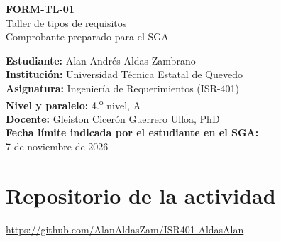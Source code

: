 \documentclass[11pt,a4paper]{article}
\begin{document}
\begin{center}
{\Large\bfseries FORM-TL-01}\\[6pt]
{\large Taller de tipos de requisitos}\\[6pt]
Comprobante preparado para el SGA
\end{center}
\noindent\textbf{Estudiante:} Alan Andrés Aldas Zambrano\\
\textbf{Institución:} Universidad Técnica Estatal de Quevedo\\
\textbf{Asignatura:} Ingeniería de Requerimientos (ISR-401)\\
\textbf{Nivel y paralelo:} 4.\textsuperscript{o} nivel, A\\
\textbf{Docente:} Gleiston Cicerón Guerrero Ulloa, PhD\\

\noindent\textbf{Fecha límite indicada por el estudiante en el SGA:}\\
7 de noviembre de 2026

\section*{Repositorio de la actividad}
\url{https://github.com/AlanAldasZam/ISR401-AldasAlan}
\end{document}
